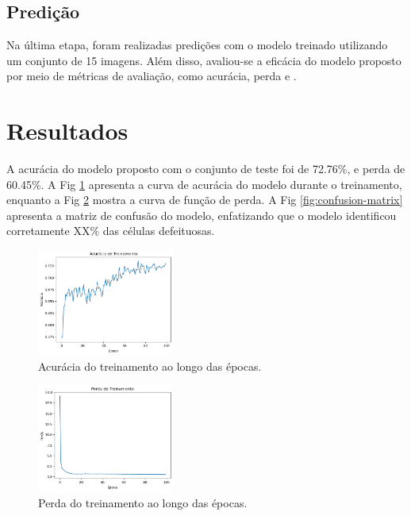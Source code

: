 \documentclass[conference]{IEEEtran}
\begin{document}
\subsection{Predição}\label{AA}

Na última etapa, foram realizadas predições com o modelo treinado utilizando
um conjunto de 15 imagens. Além disso, avaliou-se a eficácia do modelo proposto
por meio de métricas de avaliação, como acurácia, perda e .

\section{Resultados}

A acurácia do modelo proposto com o conjunto de teste foi de 72.76\%, e perda de 60.45\%. A Fig \ref{fig:training-accuracy} apresenta a curva de acurácia do modelo
durante
o treinamento, enquanto a Fig \ref{fig:training-loss} mostra a curva de função
de perda.
A Fig \ref{fig:confusion-matrix} apresenta a matriz de confusão do modelo,
enfatizando que o modelo identificou corretamente XX\% das células defeituosas.

\begin{figure}[htbp]

    \centerline{\includegraphics[width=0.4\textwidth]{images/training-accuracy.png}}
    \caption{Acurácia do treinamento ao longo das épocas.}
    \label{fig:training-accuracy}
\end{figure}

\begin{figure}[htbp]

    \centerline{\includegraphics[width=0.4\textwidth]{images/training-loss.png}}
    \caption{Perda do treinamento ao longo das épocas.}
    \label{fig:training-loss}
\end{figure}
\end{document}
